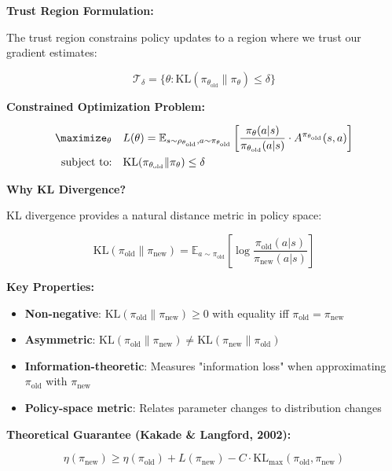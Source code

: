 \documentclass[12pt]{article}
\begin{document}
{{\textbf{Trust Region Formulation:}

The trust region constrains policy updates to a region where we trust our gradient estimates:

\begin{equation}
\mathcal{T}_\delta = \{\theta : \text{KL}(\pi_{\theta_{\text{old}}} \| \pi_\theta) \leq \delta\}
\end{equation}

\textbf{Constrained Optimization Problem:}

\begin{align}
\maximize_\theta \quad & L(\theta) = \mathbb{E}_{s \sim \rho_{\theta_{\text{old}}}, a \sim \pi_{\theta_{\text{old}}}} \left[\frac{\pi_\theta(a|s)}{\pi_{\theta_{\text{old}}}(a|s)} \cdot A^{\pi_{\theta_{\text{old}}}}(s,a)\right] \\
\text{subject to:} \quad & \text{KL}(\pi_{\theta_{\text{old}}} \| \pi_\theta) \leq \delta
\end{align}

\textbf{Why KL Divergence?}

KL divergence provides a natural distance metric in policy space:

\begin{equation}
\text{KL}(\pi_{\text{old}} \| \pi_{\text{new}}) = \mathbb{E}_{a \sim \pi_{\text{old}}} \left[\log\frac{\pi_{\text{old}}(a|s)}{\pi_{\text{new}}(a|s)}\right]
\end{equation}

\textbf{Key Properties:}
\begin{itemize}
\item \textbf{Non-negative}: $\text{KL}(\pi_{\text{old}} \| \pi_{\text{new}}) \geq 0$ with equality iff $\pi_{\text{old}} = \pi_{\text{new}}$
\item \textbf{Asymmetric}: $\text{KL}(\pi_{\text{old}} \| \pi_{\text{new}}) \neq \text{KL}(\pi_{\text{new}} \| \pi_{\text{old}})$
\item \textbf{Information-theoretic}: Measures "information loss" when approximating $\pi_{\text{old}}$ with $\pi_{\text{new}}$
\item \textbf{Policy-space metric}: Relates parameter changes to distribution changes
\end{itemize}

\textbf{Theoretical Guarantee (Kakade \& Langford, 2002):}

\begin{equation}
\eta(\pi_{\text{new}}) \geq \eta(\pi_{\text{old}}) + L(\pi_{\text{new}}) - C \cdot \text{KL}_{\max}(\pi_{\text{old}}, \pi_{\text{new}})
\end{equation}

}}
\end{document}
